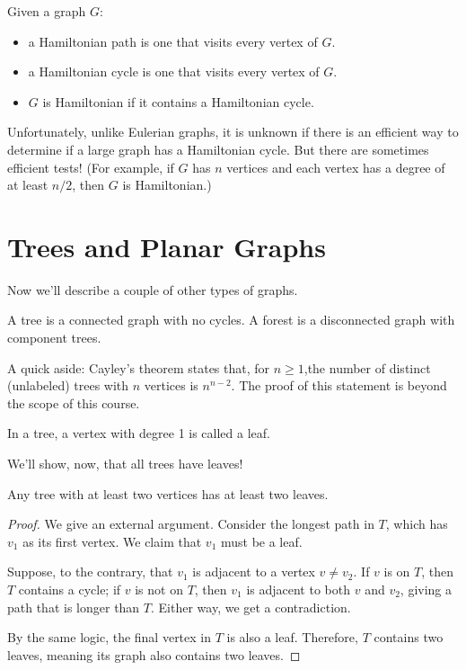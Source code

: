 \documentclass[../m055main.tex]{subfiles}
\begin{document}
\begin{definition}
    Given a graph $G$:
    \begin{itemize}
        \item a Hamiltonian path is one that visits every vertex of $G$.
        \item a Hamiltonian cycle is one that visits every vertex of $G$.
        \item $G$ is Hamiltonian if it contains a Hamiltonian cycle.
    \end{itemize}
\end{definition}

Unfortunately, unlike Eulerian graphs, it is unknown if there is an efficient way to determine if a large graph has a Hamiltonian cycle.
But there are sometimes efficient tests!
(For example, if $G$ has $n$ vertices and each vertex has a degree of at least $n/2$, then $G$ is Hamiltonian.)

\section{Trees and Planar Graphs}
Now we'll describe a couple of other types of graphs.

\begin{definition}[Tree]
    A tree is a connected graph with no cycles.
    A forest is a disconnected graph with component trees.
\end{definition}

A quick aside: Cayley's theorem states that, for $n \geq 1$,the number of distinct (unlabeled) trees with $n$ vertices is $n^{n-2}$.
The proof of this statement is beyond the scope of this course.

\begin{definition}[Leaf]
    In a tree, a vertex with degree 1 is called a leaf.
\end{definition}

We'll show, now, that all trees have leaves!

\begin{theorem}[]
    Any tree with at least two vertices has at least two leaves.
\end{theorem}

\begin{proof}
    We give an external argument.
    Consider the longest path in $T$, which has $v_1$ as its first vertex.
    We claim that $v_1$ must be a leaf.

    Suppose, to the contrary, that $v_1$ is adjacent to a vertex $v \neq v_2$.
    If $v$ is on $T$, then $T$ contains a cycle; if $v$ is not on $T$, then $v_1$ is adjacent to both $v$ and $v_2$, giving a path that is longer than $T$.
    Either way, we get a contradiction.

    By the same logic, the final vertex in $T$ is also a leaf.
    Therefore, $T$ contains two leaves, meaning its graph also contains two leaves.
\end{proof}
\end{document}
